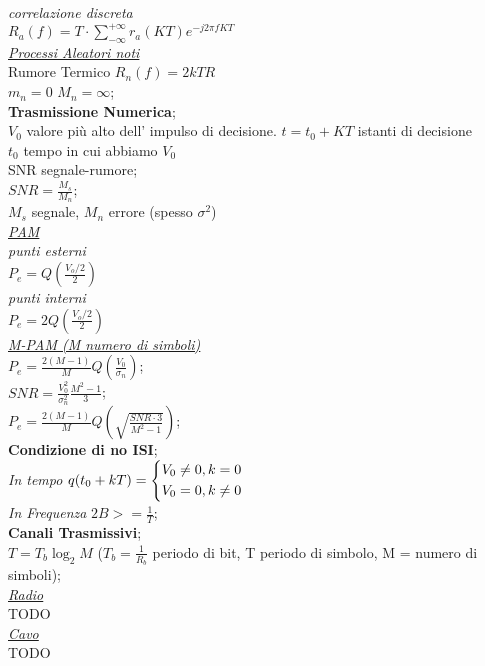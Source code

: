 \documentclass[a4paper]{article}
\begin{document}
\begin{multicols*}{3}
\textit{correlazione discreta} \\
$R_a(f)=T\cdot\sum_{-\infty}^{+\infty}r_a(KT)e^{-j2\pi fKT}$ \\
\underline{\textit{Processi Aleatori noti}} \\
Rumore Termico $R_n(f)=2kTR$ \\
$m_n=0$ $M_n=\infty$; \\
\textbf{Trasmissione Numerica}; \\
$V_0$ valore più alto dell' impulso di decisione. 
$t=t_0 + KT$ istanti di decisione\\
$t_0$ tempo in cui abbiamo $V_0$ \\
SNR segnale-rumore; \\
$SNR=\frac{M_s}{M_n}$; \\ $M_s$ segnale, $M_n$ errore (spesso $\sigma^2$) \\ 
\underline{\textit{PAM}} \\
\textit{punti esterni}\\
$P_e = Q(\frac{V_o / 2}{2}) $ \\
\textit{punti interni }\\
$P_e = 2Q(\frac{V_o / 2}{2}) $ \\
\underline{\textit{M-PAM (M numero di simboli) }} \\
$P_e = \frac{2(M-1)}{M}Q(\frac{V_0}{\sigma_n})$;\\
$SNR = \frac{V_0^2}{\sigma_n^2}\frac{M^2-1}{3}$; \\
$P_e = \frac{2(M-1)}{M}Q(\sqrt{\frac{SNR \cdot 3}{M^2-1}})$; \\
\textbf{Condizione di no ISI}; \\
\textit{In tempo}
 $ q(t_{0}+kT)=
\begin{dcases}
    V_0\ne0 , k=0  \\
    V_0=0, k\ne0  \\
\end{dcases}
$ \\
\textit{In Frequenza}
$2B >= \frac{1}{T}$; \\
\textbf{Canali Trasmissivi}; \\
$T=T_b \log_{2}{M}$ ($T_b = \frac{1}{R_b}$ periodo di bit, T periodo di simbolo,
M = numero di simboli);\\
\underline{\textit{Radio}} \\
TODO \\
\underline{\textit{Cavo}} \\
TODO \\

\end{multicols*}
\end{document}
